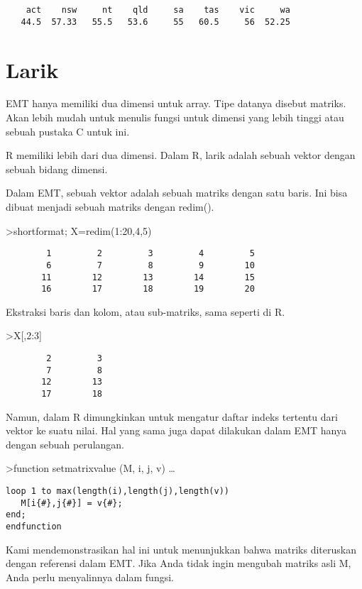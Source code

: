 \documentclass[
]{book}
\begin{document}
\begin{verbatim}
    act    nsw     nt    qld     sa    tas    vic     wa
   44.5  57.33   55.5   53.6     55   60.5     56  52.25
\end{verbatim}

\chapter{Larik}\label{larik}

EMT hanya memiliki dua dimensi untuk array. Tipe datanya disebut matriks. Akan lebih mudah untuk menulis fungsi untuk dimensi yang lebih tinggi atau sebuah pustaka C untuk ini.

R memiliki lebih dari dua dimensi. Dalam R, larik adalah sebuah vektor dengan sebuah bidang dimensi.

Dalam EMT, sebuah vektor adalah sebuah matriks dengan satu baris. Ini bisa dibuat menjadi sebuah matriks dengan redim().

\textgreater shortformat; X=redim(1:20,4,5)

\begin{verbatim}
        1         2         3         4         5 
        6         7         8         9        10 
       11        12        13        14        15 
       16        17        18        19        20 
\end{verbatim}

Ekstraksi baris dan kolom, atau sub-matriks, sama seperti di R.

\textgreater X{[},2:3{]}

\begin{verbatim}
        2         3 
        7         8 
       12        13 
       17        18 
\end{verbatim}

Namun, dalam R dimungkinkan untuk mengatur daftar indeks tertentu dari vektor ke suatu nilai. Hal yang sama juga dapat dilakukan dalam EMT hanya dengan sebuah perulangan.

\textgreater function setmatrixvalue (M, i, j, v) \ldots{}

\begin{verbatim}
loop 1 to max(length(i),length(j),length(v))
   M[i{#},j{#}] = v{#};
end;
endfunction
\end{verbatim}

Kami mendemonstrasikan hal ini untuk menunjukkan bahwa matriks diteruskan dengan referensi dalam EMT. Jika Anda tidak ingin mengubah matriks asli M, Anda perlu menyalinnya dalam fungsi.
\end{document}
